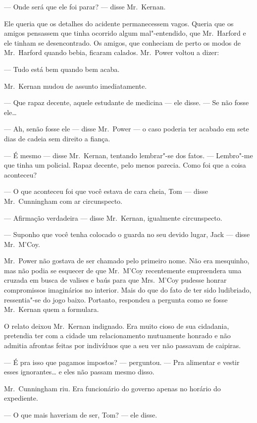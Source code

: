 --- Onde será que ele foi parar? --- disse Mr.~Kernan.

Ele queria que os detalhes do acidente permanecessem vagos.  Queria que os
amigos pensassem que tinha ocorrido algum mal"-entendido, que Mr.~Harford e ele
tinham se desencontrado.  Os amigos, que conheciam de perto os modos de 
Mr.~Harford quando bebia, ficaram calados.  Mr.~Power voltou a dizer:

--- Tudo está bem quando bem acaba.

Mr.~Kernan mudou de assunto imediatamente.

--- Que rapaz decente, aquele estudante de medicina --- ele disse.  --- Se não
fosse ele\ldots{}

--- Ah, senão fosse ele --- disse Mr.~Power --- o caso poderia ter acabado em
sete dias de cadeia sem direito a fiança.

--- É mesmo --- disse Mr.~Kernan, tentando lembrar"-se dos fatos.  --- Lembro"-me
que tinha um policial.  Rapaz decente, pelo menos parecia.  Como foi que a
coisa aconteceu?

--- O que aconteceu foi que você estava de cara cheia, Tom --- disse 
Mr.~Cunningham com ar circunspecto.

--- Afirmação verdadeira --- disse Mr.~Kernan, igualmente circunspecto.

--- Suponho que você tenha colocado o guarda no seu devido lugar, Jack ---
disse Mr.~M’Coy.

Mr.~Power não gostava de ser chamado pelo primeiro nome.  Não era mesquinho,
mas não podia se esquecer de que Mr.~M’Coy recentemente empreendera uma cruzada
em busca de valises e baús para que Mrs.~M’Coy pudesse honrar compromissos
imaginários no interior.  Mais do que do fato de ter sido ludibriado,
ressentia"-se do jogo baixo.  Portanto, respondeu a pergunta como se fosse 
Mr.~Kernan quem a formulara.

O relato deixou Mr.~Kernan indignado.  Era muito cioso de sua cidadania,
pretendia ter com a cidade um relacionamento mutuamente honrado e não admitia
afrontas feitas por indivíduos que a seu ver não passavam de caipiras.

--- É pra isso que pagamos impostos? --- perguntou.  --- Pra alimentar e vestir
esses ignorantes\ldots{} e eles não passam mesmo disso.

Mr.~Cunningham riu.  Era funcionário do governo apenas no horário do
expediente.

--- O que mais haveriam de ser, Tom? --- ele disse.

